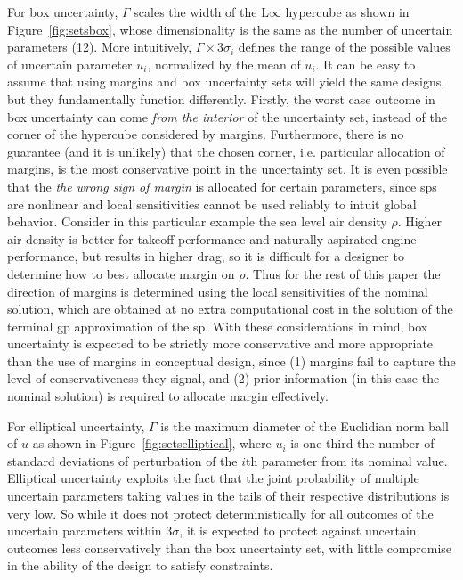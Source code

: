 For box uncertainty,
$\Gamma$ scales the width of the L$\infty$ hypercube as shown in Figure~\ref{fig:setsbox},
whose dimensionality is the same as the number of uncertain parameters (12).
More intuitively, $\Gamma \times 3\sigma_i$ defines the range of the possible values of uncertain parameter $u_i$,
normalized by the mean of $u_i$.
It can be easy to assume that using margins and box uncertainty sets will yield the same designs,
but they fundamentally function differently.
Firstly, the worst case outcome in box uncertainty can come \emph{from the interior} of the uncertainty
set, instead of the corner of the hypercube considered
by margins. Furthermore, there is no guarantee (and it is unlikely)
that the chosen corner, i.e. particular allocation of margins,
is the most conservative point in the uncertainty set.
It is even possible that the \emph{the wrong sign of margin} is allocated for certain parameters,
since \gls{sp}s are nonlinear and local sensitivities cannot be used reliably to intuit global behavior. Consider
in this particular example the sea level air density $\rho$.
Higher air density is better for takeoff performance and naturally aspirated engine performance,
but results in higher drag, so it is difficult
for a designer to determine how to best allocate margin on $\rho$. Thus for the rest
of this paper the direction of margins is determined using the local sensitivities of the nominal solution,
which are obtained at no extra computational cost in the solution of the terminal \gls{gp} approximation of the \gls{sp}.
With these considerations in mind, box uncertainty is expected to be strictly more conservative
and more appropriate than the use of margins
in conceptual design, since (1) margins fail to capture the level of conservativeness they signal, and (2) prior
information (in this case the nominal solution) is required to allocate margin effectively.

For elliptical uncertainty, $\Gamma$ is the maximum diameter of the Euclidian norm
ball of $u$ as shown in Figure~\ref{fig:setselliptical},
where $u_i$ is one-third the number of standard deviations of perturbation of the
$i$th parameter from its nominal value.
Elliptical uncertainty exploits the fact that the joint probability of
multiple uncertain parameters taking values in the tails of their respective distributions is
very low. So while it does not protect deterministically for all outcomes of the uncertain
parameters within $3\sigma$, it is expected to protect against uncertain outcomes
less conservatively than the box uncertainty set, with little compromise in the
ability of the design to satisfy constraints.
